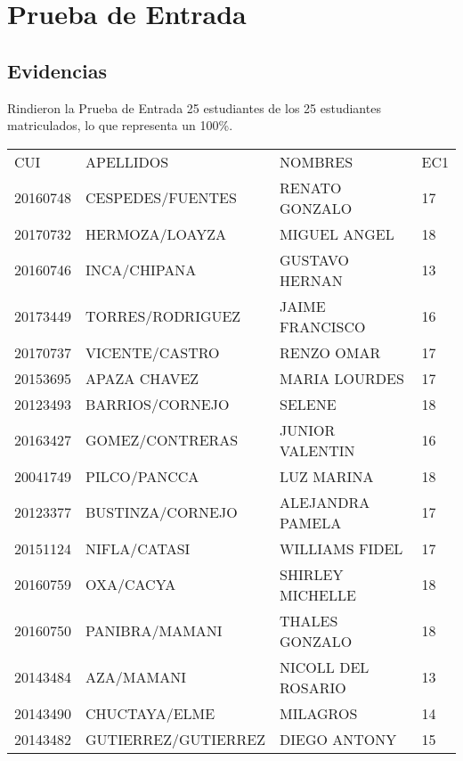\chapter{Prueba de Entrada}
\newpage



\pagestyle{empty} %

\section{Evidencias}
Rindieron la Prueba de Entrada 25 estudiantes de los 25 estudiantes matriculados, lo que representa un 100\%.


\begin{table}[H]
	\begin{tabular}{llll}
		CUI      & APELLIDOS           & NOMBRES            & EC1 \\
		20160748 & CESPEDES/FUENTES    & RENATO GONZALO     & 17  \\
		20170732 & HERMOZA/LOAYZA      & MIGUEL ANGEL       & 18  \\
		20160746 & INCA/CHIPANA        & GUSTAVO HERNAN     & 13  \\
		20173449 & TORRES/RODRIGUEZ    & JAIME FRANCISCO    & 16  \\
		20170737 & VICENTE/CASTRO      & RENZO OMAR         & 17  \\
		20153695 & APAZA CHAVEZ        & MARIA LOURDES      & 17  \\
		20123493 & BARRIOS/CORNEJO     & SELENE             & 18  \\
		20163427 & GOMEZ/CONTRERAS     & JUNIOR VALENTIN    & 16  \\
		20041749 & PILCO/PANCCA        & LUZ MARINA         & 18  \\
		20123377 & BUSTINZA/CORNEJO    & ALEJANDRA PAMELA   & 17  \\
		20151124 & NIFLA/CATASI        & WILLIAMS FIDEL     & 17  \\
		20160759 & OXA/CACYA           & SHIRLEY MICHELLE   & 18  \\
		20160750 & PANIBRA/MAMANI      & THALES GONZALO     & 18  \\
		20143484 & AZA/MAMANI          & NICOLL DEL ROSARIO & 13  \\
		20143490 & CHUCTAYA/ELME       & MILAGROS           & 14  \\
		20143482 & GUTIERREZ/GUTIERREZ & DIEGO ANTONY       & 15  \\

\end{tabular}
\end{table}
